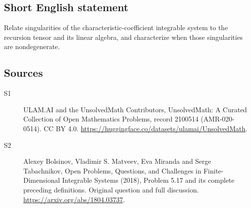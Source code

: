 \documentclass[11pt]{article}
\begin{document}
\subsection{Short English statement}
Relate singularities of the characteristic-coefficient integrable system to the recursion tensor and its linear algebra, and characterize when those singularities are nondegenerate.
\subsection{Sources}
\begin{description}
\item[\hypertarget{source:2100514:1}{S1}] ULAM.AI and the UnsolvedMath Contributors, UnsolvedMath: A Curated Collection of Open Mathematics Problems, record 2100514 (AMR-020-0514). CC BY 4.0. \url{https://huggingface.co/datasets/ulamai/UnsolvedMath}.
\item[\hypertarget{source:2100514:2}{S2}] Alexey Bolsinov, Vladimir S. Matveev, Eva Miranda and Serge Tabachnikov, Open Problems, Questions, and Challenges in Finite-Dimensional Integrable Systems (2018), Problem 5.17 and its complete preceding definitions. Original question and full discussion. \url{https://arxiv.org/abs/1804.03737}.

\end{description}
\label{end:2100514}
\end{document}
